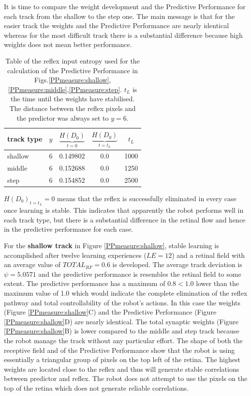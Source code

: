 It is time to compare the weight development and the Predictive Performance for
each track from the shallow to the step one.
The main message is that for the easier track the weights and the Predictive Performance
are nearly identical whereas for the most difficult track there is a substantial difference
because high weights does not mean better performance.
 
\begin{table}[htbp]
\caption[Reflex input values for the 3 tracks]{Table of the reflex input entropy used for the calculation of the Predictive Performance
in Figs.\ref{PPmeasure:shallow},\ref{PPmeasure:middle},\ref{PPmeasure:step}.
$t_L$ is the time until the weights have stabilised. The distance between the reflex pixels
and the predictor was always set to $y=6$.}
\label{table:PPmeausure:TableReflexFullTracks}
\begin{center}
  \begin{tabular}{| l | c | c | c | c | }
    \hline
    \textbf{track type}  & $y$  & $\underbrace{H(D_{0})}_{t=0} $ & $\underbrace{H(D_{0})}_{t=t_L} $ & $t_L$ \\ \hline
    shallow 		 & 6 	& 0.149802 	    & 0.0 & 1000 \\ \hline
    middle  		 & 6    & 0.152688 	    & 0.0 & 1250 \\ \hline
    step    		 & 6 	& 0.154852 	    & 0.0 & 2500 \\ \hline
  \end{tabular}
\end{center}
\end{table}

$H(D_{0})_{t=t_L}=0$ means that the reflex is successfully eliminated in every case once learning is stable.
This indicates that apparently the robot performs well in each track type, but there is a substantial difference 
in the retinal flow and hence in the predictive performance for each case.

For the \textbf{shallow track} in Figure \ref{PPmeasure:shallow}, stable learning is accomplished
after twelve learning experiences ($LE=12$) and a retinal field with an average value of $TOTAL_{RF}=0.6$ is developed.
The average track deviation is $\psi=5.0571$ and the predictive performance is resembles
the retinal field to some extent.
The predictive performance has a maximum of $0.8 < 1.0$ lower than
the maximum value of 1.0 which would indicate the complete elimination of the reflex
pathway and total controllability of the robot's actions.
In this case the weights (Figure \ref{PPmeasure:shallow}C) and the Predictive Performance (Figure \ref{PPmeasure:shallow}D)
are nearly identical.
The total synaptic weights (Figure \ref{PPmeasure:shallow}B) is lower compared
to the middle and step track because the robot manage the track without any
particular effort.
The shape of both the receptive field and of the Predictive Performance show that
the robot is using essentially a triangular group of pixels on the top left of the retina.
The highest weights are located close to the reflex and thus will generate stable
correlations between predictor and reflex.
The robot does not attempt to use the pixels on the top of the retina which does
not generate reliable correlations.

